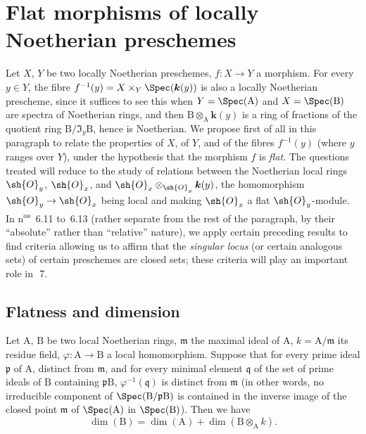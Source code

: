 \section{Flat morphisms of locally Noetherian preschemes}
\label{section:IV.6}

Let $X$, $Y$ be two locally Noetherian preschemes, $f:X\to Y$ a morphism.
For every $y\in Y$, the fibre $f^{-1}(y)=X\times_Y\Spec(\boldsymbol{k}(y))$ is also a locally Noetherian prescheme, since it suffices to see this when $Y=\Spec(\mathrm{A})$ and $X=\Spec(\mathrm{B})$ are spectra of Noetherian rings, and then $\mathrm{B}\otimes_\mathrm{A}\boldsymbol{k}(y)$ is a ring of fractions of the quotient ring $\mathrm{B}/\mathfrak{I}_y\mathrm{B}$, hence is Noetherian.
We propose first of all in this paragraph to relate the properties of $X$, of $Y$, and of the fibres $f^{-1}(y)$ (where $y$ ranges over $Y$), under the hypothesis that the morphism $f$ is \emph{flat}.
The questions treated will reduce to the study of relations between the Noetherian local rings $\sh{O}_y$, $\sh{O}_x$, and $\sh{O}_x\otimes_{\sh{O}_y}\boldsymbol{k}(y)$, the homomorphism $\sh{O}_y\to\sh{O}_x$ being local and making $\sh{O}_x$ a flat $\sh{O}_y$-module.
In n\textsuperscript{os}~6.11
to~6.13 (rather separate from the rest of the paragraph, by their ``absolute'' rather than ``relative'' nature), we apply certain preceding results to find criteria allowing us to affirm that the \emph{singular locus} (or certain analogous sets) of certain preschemes are closed sets; these criteria will play an important role in~\textsection\,7.

\subsection{Flatness and dimension}
\label{subsection:IV.6.1}

\begin{proposition}[6.1.1]
\label{IV.6.1.1}
Let $\mathrm{A}$, $\mathrm{B}$ be two local Noetherian rings, $\mathfrak{m}$ the maximal ideal of $\mathrm{A}$, $k=\mathrm{A}/\mathfrak{m}$ its residue field, $\varphi:\mathrm{A}\to\mathrm{B}$ a local homomorphism.
Suppose that for every prime ideal $\mathfrak{p}$ of $\mathrm{A}$, distinct from $\mathfrak{m}$, and for every minimal element $\mathfrak{q}$ of the set of prime ideals of $\mathrm{B}$ containing $\mathfrak{p}\mathrm{B}$, $\varphi^{-1}(\mathfrak{q})$ is distinct from $\mathfrak{m}$ (in other words, no irreducible component of $\Spec(\mathrm{B}/\mathfrak{p}\mathrm{B})$ is contained in the inverse image of the closed point $\mathfrak{m}$ of $\Spec(\mathrm{A})$ in $\Spec(\mathrm{B})$).
Then we have
\begin{equation}
  \dim(\mathrm{B})=\dim(\mathrm{A})+\dim(\mathrm{B}\otimes_\mathrm{A} k).
  \tag{6.1.1.1}
\label{IV.6.1.1.1}
\end{equation}
\end{proposition}

